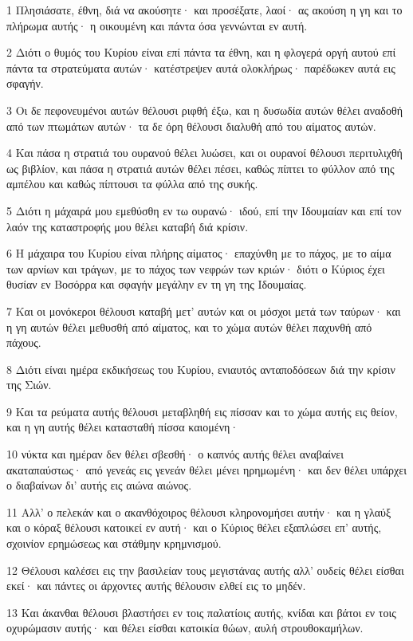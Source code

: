 \par 1 Πλησιάσατε, έθνη, διά να ακούσητε· και προσέξατε, λαοί· ας ακούση η γη και το πλήρωμα αυτής· η οικουμένη και πάντα όσα γεννώνται εν αυτή.
\par 2 Διότι ο θυμός του Κυρίου είναι επί πάντα τα έθνη, και η φλογερά οργή αυτού επί πάντα τα στρατεύματα αυτών· κατέστρεψεν αυτά ολοκλήρως· παρέδωκεν αυτά εις σφαγήν.
\par 3 Οι δε πεφονευμένοι αυτών θέλουσι ριφθή έξω, και η δυσωδία αυτών θέλει αναδοθή από των πτωμάτων αυτών· τα δε όρη θέλουσι διαλυθή από του αίματος αυτών.
\par 4 Και πάσα η στρατιά του ουρανού θέλει λυώσει, και οι ουρανοί θέλουσι περιτυλιχθή ως βιβλίον, και πάσα η στρατιά αυτών θέλει πέσει, καθώς πίπτει το φύλλον από της αμπέλου και καθώς πίπτουσι τα φύλλα από της συκής.
\par 5 Διότι η μάχαιρά μου εμεθύσθη εν τω ουρανώ· ιδού, επί την Ιδουμαίαν και επί τον λαόν της καταστροφής μου θέλει καταβή διά κρίσιν.
\par 6 Η μάχαιρα του Κυρίου είναι πλήρης αίματος· επαχύνθη με το πάχος, με το αίμα των αρνίων και τράγων, με το πάχος των νεφρών των κριών· διότι ο Κύριος έχει θυσίαν εν Βοσόρρα και σφαγήν μεγάλην εν τη γη της Ιδουμαίας.
\par 7 Και οι μονόκεροι θέλουσι καταβή μετ' αυτών και οι μόσχοι μετά των ταύρων· και η γη αυτών θέλει μεθυσθή από αίματος, και το χώμα αυτών θέλει παχυνθή από πάχους.
\par 8 Διότι είναι ημέρα εκδικήσεως του Κυρίου, ενιαυτός ανταποδόσεων διά την κρίσιν της Σιών.
\par 9 Και τα ρεύματα αυτής θέλουσι μεταβληθή εις πίσσαν και το χώμα αυτής εις θείον, και η γη αυτής θέλει κατασταθή πίσσα καιομένη·
\par 10 νύκτα και ημέραν δεν θέλει σβεσθή· ο καπνός αυτής θέλει αναβαίνει ακαταπαύστως· από γενεάς εις γενεάν θέλει μένει ηρημωμένη· και δεν θέλει υπάρχει ο διαβαίνων δι' αυτής εις αιώνα αιώνος.
\par 11 Αλλ' ο πελεκάν και ο ακανθόχοιρος θέλουσι κληρονομήσει αυτήν· και η γλαύξ και ο κόραξ θέλουσι κατοικεί εν αυτή· και ο Κύριος θέλει εξαπλώσει επ' αυτής, σχοινίον ερημώσεως και στάθμην κρημνισμού.
\par 12 Θέλουσι καλέσει εις την βασιλείαν τους μεγιστάνας αυτής αλλ' ουδείς θέλει είσθαι εκεί· και πάντες οι άρχοντες αυτής θέλουσιν ελθεί εις το μηδέν.
\par 13 Και άκανθαι θέλουσι βλαστήσει εν τοις παλατίοις αυτής, κνίδαι και βάτοι εν τοις οχυρώμασιν αυτής· και θέλει είσθαι κατοικία θώων, αυλή στρουθοκαμήλων.
